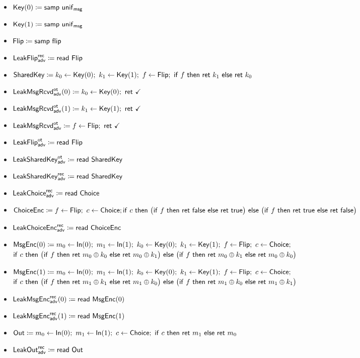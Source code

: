 \begin{itemize}
\item $\Key(0) \coloneqq \samp{\unif_\msg}$
\item $\Key(1) \coloneqq \samp{\unif_\msg}$
\item $\Flip \coloneqq \samp{\flip}$
\item {\color{blue} $\LeakFlip^\rec_\adv \coloneqq \read{\Flip}$}
\item $\SharedKey \coloneqq k_0 \leftarrow \Key(0); \ k_1 \leftarrow \Key(1); \ f \leftarrow \Flip; \ \ifte{f}{\ret{k_1}}{\ret{k_0}}$
\item {\color{blue} $\LeakKeyRcvd^\ot_\adv(0) \coloneqq k_0 \leftarrow \Key(0); \ \ret{\checkmark}$}
\item {\color{blue} $\LeakKeyRcvd^\ot_\adv(1) \coloneqq k_1 \leftarrow \Key(1); \ \ret{\checkmark}$}
\item {\color{blue} $\LeakFlipRcvd^\ot_\adv \coloneqq f \leftarrow \Flip; \ \ret{\checkmark}$}
\item {\color{blue} $\LeakFlip^\ot_\adv \coloneqq \read{\Flip}$}
\item {\color{blue} $\LeakSharedKey^\ot_\adv \coloneqq \read{\SharedKey}$}
\item {\color{blue} $\LeakSharedKey^\rec_\adv \coloneqq \read{\SharedKey}$}
\item {\color{blue} $\LeakChoice^\rec_\adv \coloneqq \read{\Choice}$}
\item $\ChoiceEnc \coloneqq f \leftarrow \Flip; \ c \leftarrow \Choice; \\ \ifte{c}{\big(\ifte{f}{\ret{\false}}{\ret{\true}}\big)}{\big(\ifte{f}{\ret{\true}}{\ret{\false}}\big)}$
\item {\color{blue} $\LeakChoiceEnc^\rec_\adv \coloneqq \read{\ChoiceEnc}$}
\item $\MsgEnc(0) \coloneqq m_0 \leftarrow \In(0); \ m_1 \leftarrow \In(1); \ k_0 \leftarrow \Key(0); \ k_1 \leftarrow \Key(1); \ f \leftarrow \Flip; \ c \leftarrow \Choice;$ \\ $\ifte{c}{\big(\ifte{f}{\ret{m_0 \oplus k_0}}{\ret{m_0 \oplus k_1}}\big)}{\big(\ifte{f}{\ret{m_0 \oplus k_1}}{\ret{m_0 \oplus k_0}}\big)}$
\item $\MsgEnc(1) \coloneqq m_0 \leftarrow \In(0); \ m_1 \leftarrow \In(1); \ k_0 \leftarrow \Key(0); \ k_1 \leftarrow \Key(1); \ f \leftarrow \Flip; \ c \leftarrow \Choice;$ \\ $\ifte{c}{\big(\ifte{f}{\ret{m_1 \oplus k_1}}{\ret{m_1 \oplus k_0}}\big)}{\big(\ifte{f}{\ret{m_1 \oplus k_0}}{\ret{m_1 \oplus k_1}}\big)}$
\item {\color{blue} $\LeakMsgEnc^\rec_\adv(0) \coloneqq \read{\MsgEnc(0)}$}
\item {\color{blue} $\LeakMsgEnc^\rec_\adv(1) \coloneqq \read{\MsgEnc(1)}$}
\item $\Out \coloneqq m_0 \leftarrow \In(0); \ m_1 \leftarrow \In(1); \ c \leftarrow \Choice; \ \ifte{c}{\ret{m_1}}{\ret{m_0}}$
\item {\color{blue} $\LeakOut^\rec_\adv \coloneqq \read{\Out}$}
\end{itemize}


